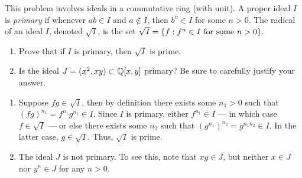 %
\begin{question}[subtitle = August 2019 Problem 2,ID=Aug19_2]
This problem involves ideals in a commutative ring (with unit). A proper ideal $I$ is \emph{primary} if whenever $ab \in I$ and $a \notin I$, then $b^n \in I$ for some $n > 0$. The radical of an ideal $I$, denoted $\sqrt{I}$, is the set $\sqrt{I} = \{f: f^n \in I \text{ for some } n>0\}$.
\begin{enumerate}
    \item Prove that if $I$ is primary, then $\sqrt{I}$ is prime.
    \item Is the ideal $J = (x^2,xy) \subset \mathbb{Q}[x,y]$ primary?  Be sure to carefully justify your answer.
\end{enumerate}
\end{question}
\begin{solution}
\begin{enumerate}
    \item Suppose $fg \in \sqrt{I}$, then by definition there exists some $n_1 > 0$ such that $(fg)^{n_1} = f^{n_1} g^{n_1}\in I$. Since $I$ is primary, either $f^{n_1} \in I$ --- in which case $f \in \sqrt{I}$ --- or else there exists some $n_2$ such that $(g^{n_1})^{n_2} = g^{n_1 n_2} \in I$. In the latter case, $g \in \sqrt{I}$. Thus, $\sqrt{I}$ is prime.
    \item The ideal $J$ is not primary. To see this, note that $xy \in J$, but neither $x \in J$ nor $y^n \in J$ for any $n > 0$.
\end{enumerate}
\end{solution}

